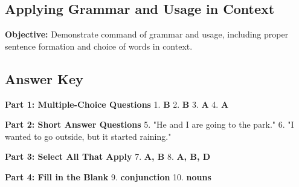\documentclass[12pt]{article}
\begin{document}
\subsection*{Applying Grammar and Usage in Context}
\onehalfspacing

\begin{tcolorbox}[colframe=black!40, colback=gray!0, title=Learning Objective]
\textbf{Objective:} Demonstrate command of grammar and usage, including proper sentence formation and choice of words in context.
\end{tcolorbox}

\subsection*{Answer Key}

\textbf{Part 1: Multiple-Choice Questions}  
1. \textbf{B}  
2. \textbf{B}  
3. \textbf{A}  
4. \textbf{A}  

\textbf{Part 2: Short Answer Questions}  
5. "He and I are going to the park."  
6. "I wanted to go outside, but it started raining."  

\textbf{Part 3: Select All That Apply}  
7. \textbf{A, B}  
8. \textbf{A, B, D}  

\textbf{Part 4: Fill in the Blank}  
9. \textbf{conjunction}  
10. \textbf{nouns}  
\end{document}
